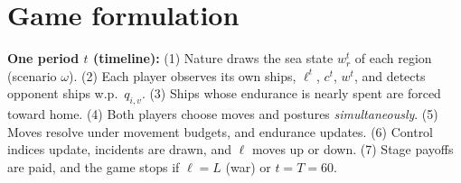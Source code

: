 \documentclass[10pt]{article}
\newcommand{\1}{\mathbf{1}}
\begin{document}
\section{Game formulation}
\textbf{One period $t$ (timeline):} (1) Nature draws the sea state $w^t_r$ of each region (scenario $\omega$).
(2) Each player observes its own ships, $\ell^t$, $c^t$, $w^t$, and detects opponent ships w.p.\ $q_{i,v}$. (3) Ships
whose endurance is nearly spent are forced toward home. (4) Both players choose moves and postures
\emph{simultaneously}. (5) Moves resolve under movement budgets, and endurance updates. (6) Control indices update,
incidents are drawn, and $\ell$ moves up or down. (7) Stage payoffs are paid, and the game stops if $\ell=L$ (war) or
$t=T=60$.
\end{document}

